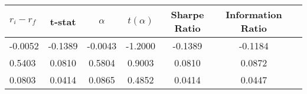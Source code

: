 \begin{tabular}{lcccccc}
\toprule
$r_i - r_f$ & t-stat & $\alpha$ & $t(\alpha)$ & Sharpe Ratio & Information Ratio \\
\midrule
-0.0052 & -0.1389 & -0.0043 & -1.2000 & -0.1389 & -0.1184 \\
0.5403 & 0.0810 & 0.5804 & 0.9003 & 0.0810 & 0.0872 \\
0.0803 & 0.0414 & 0.0865 & 0.4852 & 0.0414 & 0.0447 \\
\bottomrule
\end{tabular}
